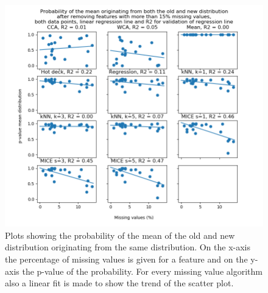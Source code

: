 \documentclass[10pt,a4paper]{report}
\begin{document}
	\begin{figure}[H]
		\centering
		\includegraphics[width=\textwidth]{Mean_Dist_Extra_ACA.PNG}
		\caption{Plots showing the probability of the mean of the old and new distribution originating from the same distribution. On the x-axis the percentage of missing values is given for a feature and on the y-axis the p-value of the probability. For every missing value algorithm also a linear fit is made to show the trend of the scatter plot.}
		\label{fig:PMeanFitsACA}
	\end{figure}
	
\end{document}
